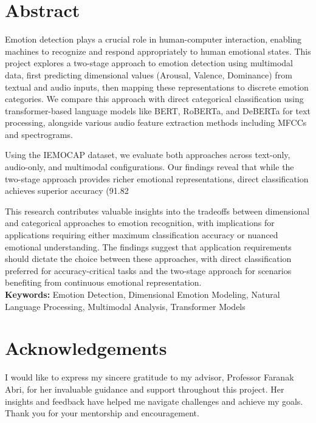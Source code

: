 \documentclass[12pt]{article}
\begin{document}

\doublespacing
\section*{Abstract}
\bigskip
Emotion detection plays a crucial role in human-computer interaction, enabling machines to recognize and respond appropriately to human emotional states. This project explores a two-stage approach to emotion detection using multimodal data, first predicting dimensional values (Arousal, Valence, Dominance) from textual and audio inputs, then mapping these representations to discrete emotion categories. We compare this approach with direct categorical classification using transformer-based language models like BERT, RoBERTa, and DeBERTa for text processing, alongside various audio feature extraction methods including MFCCs and spectrograms. 

Using the IEMOCAP dataset, we evaluate both approaches across text-only, audio-only, and multimodal configurations. Our findings reveal that while the two-stage approach provides richer emotional representations, direct classification achieves superior accuracy (91.82%

This research contributes valuable insights into the tradeoffs between dimensional and categorical approaches to emotion recognition, with implications for applications requiring either maximum classification accuracy or nuanced emotional understanding. The findings suggest that application requirements should dictate the choice between these approaches, with direct classification preferred for accuracy-critical tasks and the two-stage approach for scenarios benefiting from continuous emotional representation.\\

\noindent \textbf{Keywords:} Emotion Detection, Dimensional Emotion Modeling, Natural Language Processing, Multimodal Analysis, Transformer Models
\newpage
\section*{Acknowledgements}
I would like to express my sincere gratitude to my advisor, Professor Faranak Abri, for her invaluable guidance and support throughout this project. Her insights and feedback have helped me navigate challenges and achieve my goals. Thank you for your mentorship and encouragement.\\
  
\end{document}
